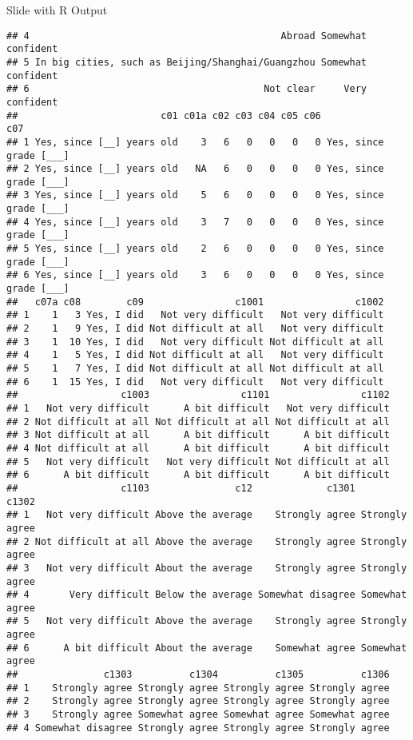 \documentclass[
  ignorenonframetext,
]{beamer}
\begin{document}
\begin{frame}[fragile]{Slide with R Output}
\begin{verbatim}
## 4                                            Abroad Somewhat confident
## 5 In big cities, such as Beijing/Shanghai/Guangzhou Somewhat confident
## 6                                         Not clear     Very confident
##                         c01 c01a c02 c03 c04 c05 c06                     c07
## 1 Yes, since [__] years old    3   6   0   0   0   0 Yes, since grade [___] 
## 2 Yes, since [__] years old   NA   6   0   0   0   0 Yes, since grade [___] 
## 3 Yes, since [__] years old    5   6   0   0   0   0 Yes, since grade [___] 
## 4 Yes, since [__] years old    3   7   0   0   0   0 Yes, since grade [___] 
## 5 Yes, since [__] years old    2   6   0   0   0   0 Yes, since grade [___] 
## 6 Yes, since [__] years old    3   6   0   0   0   0 Yes, since grade [___] 
##   c07a c08        c09                c1001                c1002
## 1    1   3 Yes, I did   Not very difficult   Not very difficult
## 2    1   9 Yes, I did Not difficult at all   Not very difficult
## 3    1  10 Yes, I did   Not very difficult Not difficult at all
## 4    1   5 Yes, I did Not difficult at all   Not very difficult
## 5    1   7 Yes, I did Not difficult at all Not difficult at all
## 6    1  15 Yes, I did   Not very difficult   Not very difficult
##                  c1003                c1101                c1102
## 1   Not very difficult      A bit difficult   Not very difficult
## 2 Not difficult at all Not difficult at all Not difficult at all
## 3 Not difficult at all      A bit difficult      A bit difficult
## 4 Not difficult at all      A bit difficult      A bit difficult
## 5   Not very difficult   Not very difficult Not difficult at all
## 6      A bit difficult      A bit difficult      A bit difficult
##                  c1103               c12             c1301          c1302
## 1   Not very difficult Above the average    Strongly agree Strongly agree
## 2 Not difficult at all Above the average    Strongly agree Strongly agree
## 3   Not very difficult About the average    Strongly agree Strongly agree
## 4       Very difficult Below the average Somewhat disagree Somewhat agree
## 5   Not very difficult Above the average    Strongly agree Strongly agree
## 6      A bit difficult About the average    Somewhat agree Somewhat agree
##               c1303          c1304          c1305          c1306
## 1    Strongly agree Strongly agree Strongly agree Strongly agree
## 2    Strongly agree Strongly agree Strongly agree Strongly agree
## 3    Strongly agree Somewhat agree Somewhat agree Somewhat agree
## 4 Somewhat disagree Strongly agree Strongly agree Strongly agree

\end{verbatim}
\end{frame}
\end{document}

